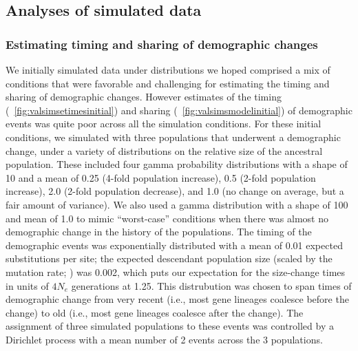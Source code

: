 \subsection{Analyses of simulated data}

\subsubsection{Estimating timing and sharing of demographic changes}

We initially simulated data under distributions we hoped comprised a mix of
conditions that were favorable and challenging for estimating the timing and
sharing of demographic changes.
However estimates of the timing
(\fig{}~\ref{fig:valsimsetimesinitial})
and sharing
(\fig{}~\ref{fig:valsimsmodelinitial})
of demographic events was quite poor across all the simulation conditions.
For these initial conditions, we simulated \datasets with three populations
that underwent a demographic change, under a variety of distributions on the
relative size of the ancestral population.
These included four gamma probability distributions with a shape of 10 and a
mean of
0.25 (4-fold population increase),
0.5 (2-fold population increase),
2.0 (2-fold population decrease), and
1.0 (no change on average, but a fair amount of variance).
We also used a gamma distribution with a shape of 100 and mean of 1.0
to mimic ``worst-case'' conditions when there was almost no demographic
change in the history of the populations.
The timing of the demographic events was exponentially distributed with a mean
of 0.01 expected substitutions per site;
the expected descendant population size
(scaled by the mutation rate; \epopsize\murate)
was 0.002,
which puts our expectation for the size-change times in units of $4N_e$
generations at 1.25.
This distrubution was chosen to span times of demographic change from very
recent (i.e., most gene lineages coalesce before the change) to old (i.e., most
gene lineages coalesce after the change).
The assignment of three simulated populations to these events was controlled by
a Dirichlet process with a mean number of 2 events across the 3 populations.

